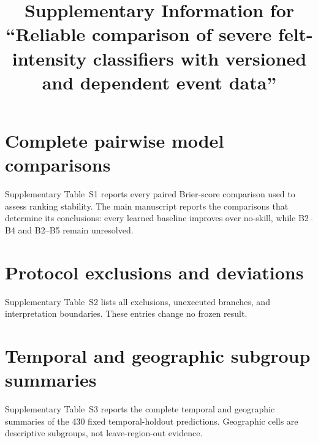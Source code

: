 \documentclass[pdflatex,sn-basic,Numbered]{sn-jnl}
\begin{document}
\title{Supplementary Information for ``Reliable comparison of severe
felt-intensity classifiers with versioned and dependent event data''}

\author*[1]{ }
\author[1]{ }

\maketitle

\renewcommand{\thetable}{S\arabic{table}}

\section*{Complete pairwise model comparisons}

Supplementary Table~S1 reports every paired Brier-score comparison used to
assess ranking stability. The main manuscript reports the comparisons that
determine its conclusions: every learned baseline improves over no-skill, while
B2--B4 and B2--B5 remain unresolved.


\FloatBarrier

\section*{Protocol exclusions and deviations}

Supplementary Table~S2 lists all exclusions, unexecuted branches, and
interpretation boundaries. These entries change no frozen result.


\FloatBarrier

\section*{Temporal and geographic subgroup summaries}

Supplementary Table~S3 reports the complete temporal and geographic summaries
of the 430 fixed temporal-holdout predictions. Geographic cells are descriptive
subgroups, not leave-region-out evidence.


\FloatBarrier
\end{document}
